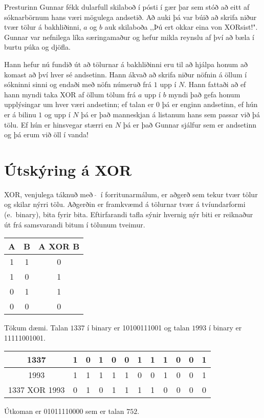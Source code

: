 
Presturinn Gunnar fékk dularfull skilaboð í pósti í gær þar sem stóð að eitt af 
sóknarbörnum hans væri mögulega andsetið. Að auki þá var búið að skrifa niður tvær
tölur á bakhliðinni, $a$ og $b$ auk skilaboða ,,Þú ert okkar eina von XORsist!". Gunnar var
nefnilega líka særingamaður og hefur mikla reynslu af því að bæla í burtu púka og djöfla.

Hann hefur nú fundið út að tölurnar á bakhliðinni eru til að hjálpa honum að komast að því
hver sé andsetinn. Hann ákvað að skrifa niður nöfnin á öllum í sókninni sinni og endaði með nöfn
númeruð frá $1$ upp í $N$. Hann fattaði að ef hann myndi taka XOR af öllum tölum frá
$a$ upp í $b$ myndi það gefa honum upplýsingar um hver væri andsetinn; ef talan er $0$ þá er enginn
andsetinn, ef hún er á bilinu $1$ og upp í $N$ þá er það manneskjan á listanum hans sem
passar við þá tölu. Ef hún er hinsvegar stærri en $N$ þá er það Gunnar sjálfur sem er
andsetinn og þá erum við öll í vanda! 


\section*{Útskýring á XOR}
XOR, venjulega táknuð með $~\hat{}~$ í forritunarmálum, er aðgerð sem tekur tvær
tölur og skilar nýrri tölu. Aðgerðin er framkvæmd á tölurnar tvær á
tvíundarformi (e.\ binary), bita fyrir bita. Eftirfarandi tafla sýnir hvernig
nýr biti er reiknaður út frá samsvarandi bitum í tölunum tveimur.
\begin{center}
\begin{tabular}{|c|c|c|}
\hline
A & B & A XOR B \\ \hline
1 & 1 & 0 \\ \hline
1 & 0 & 1 \\ \hline
0 & 1 & 1 \\ \hline
0 & 0 & 0 \\ \hline
\end{tabular}
\end{center}

Tökum dæmi. Talan $1337$ í binary er 10100111001 og talan $1993$ í binary er 11111001001.
\begin{center}
\begin{tabular}{|c|ccccccccccc|}
\hline
1337 & 1 & 0 & 1 & 0 & 0 & 1 & 1 & 1 & 0 & 0 & 1\\ \hline
1993 & 1 & 1 & 1 & 1 & 1 & 0 & 0 & 1 & 0 & 0 & 1 \\ \hline
1337 XOR 1993 & 0 & 1 & 0 & 1 & 1 & 1 & 1 & 0 & 0 & 0 & 0 \\ \hline
\end{tabular}
\end{center}
Útkoman er 01011110000 sem er talan $752$.

